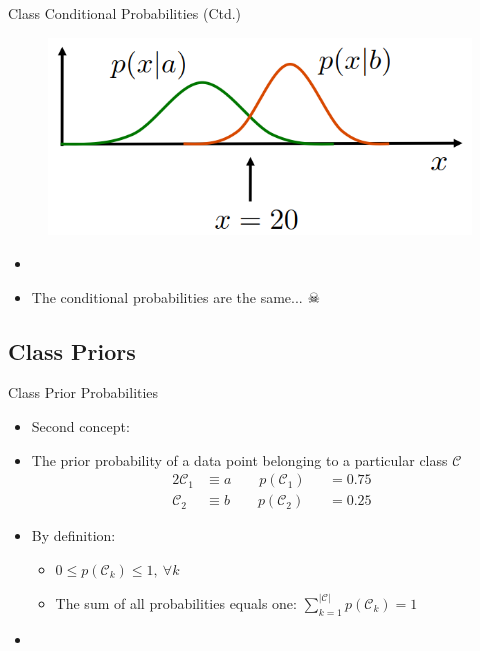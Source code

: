 \begin{frame}{Class Conditional Probabilities (Ctd.)}{}
	\begin{figure}
		\centering
		\includegraphics[scale=0.5]{03_decision_theory/02_img/conditional_probabilities_overlap3}
	\end{figure}
	\vspace*{-3mm}
	\begin{itemize}
		\item {}
		\item The conditional probabilities are the same... $\skull$
	\end{itemize}
\end{frame}


\subsection{Class Priors}

\begin{frame}{Class Prior Probabilities}{}
	\begin{itemize}
		\item Second concept: 
		\item The prior probability of a data point belonging to a particular class $\mathcal{C}$
		\begin{alignat*}{2}
			\mathcal{C}_1 &\equiv a \qquad p(\mathcal{C}_1) &&= 0.75 \\
			\mathcal{C}_2 &\equiv b \qquad p(\mathcal{C}_2) &&= 0.25
		\end{alignat*}
		\item By definition:
		\begin{itemize}
			\item $0 \le p(\mathcal{C}_k) \le 1,\ \forall k$
			\item The sum of all probabilities equals one: $\sum_{k=1}^{\vert \mathcal{C} \vert} p(\mathcal{C}_k) = 1$
		\end{itemize}
		\item {}
	\end{itemize}
\end{frame}


